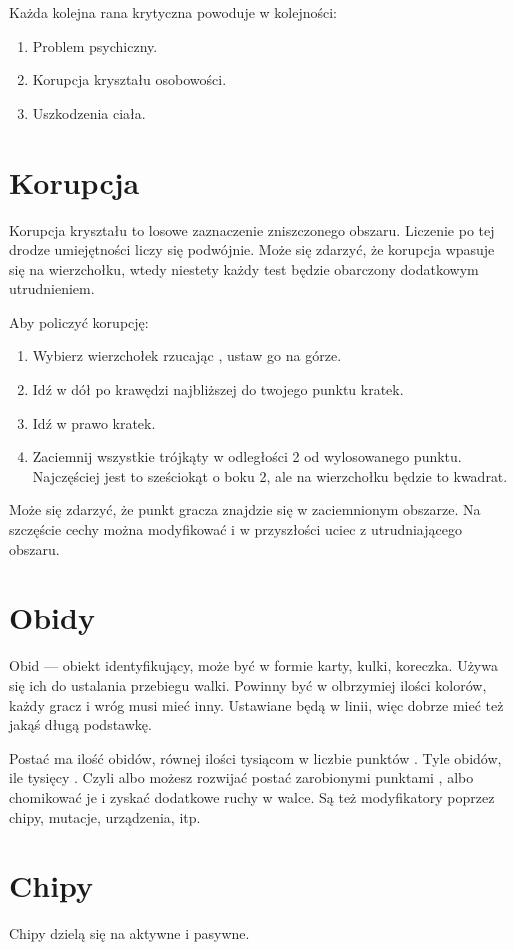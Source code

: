 Każda kolejna rana krytyczna powoduje w kolejności:
\begin{enumerate}
\item Problem psychiczny.
\item Korupcja kryształu osobowości.
\item Uszkodzenia ciała.
\end{enumerate}

\section{Korupcja}
Korupcja kryształu to losowe zaznaczenie zniszczonego obszaru.
Liczenie po tej drodze umiejętności liczy się podwójnie.
Może się zdarzyć, że korupcja wpasuje się na wierzchołku, wtedy niestety każdy test będzie obarczony dodatkowym utrudnieniem.

Aby policzyć korupcję:
\begin{enumerate}
 \item Wybierz wierzchołek rzucając \dvi{}, ustaw go na górze.
 \item Idź w dół po krawędzi najbliższej do twojego punktu \dxx{} kratek.
 \item Idź w prawo \dxx[2]{} kratek.
 \item Zaciemnij wszystkie trójkąty w odległości 2 od wylosowanego punktu. Najczęściej jest to sześciokąt o boku 2, ale na wierzchołku będzie to kwadrat.
\end{enumerate}
Może się zdarzyć, że punkt gracza znajdzie się w zaciemnionym obszarze. 
Na szczęście cechy można modyfikować i w przyszłości uciec z utrudniającego obszaru.

\section{Obidy}
Obid --- obiekt identyfikujący, może być w formie karty, kulki, koreczka.
Używa się ich do ustalania przebiegu walki.
Powinny być w olbrzymiej ilości kolorów, każdy gracz i wróg musi mieć inny.
Ustawiane będą w linii, więc dobrze mieć też jakąś długą podstawkę.

Postać ma ilość obidów, równej ilości tysiącom w liczbie punktów \xpmcn{}.
Tyle obidów, ile tysięcy \xpmcn{}.
Czyli albo możesz rozwijać postać zarobionymi punktami \xpmcn{}, albo chomikować je i zyskać dodatkowe ruchy w walce.
Są też modyfikatory poprzez chipy, mutacje, urządzenia, itp.

\section{Chipy}
Chipy dzielą się na aktywne i pasywne.

